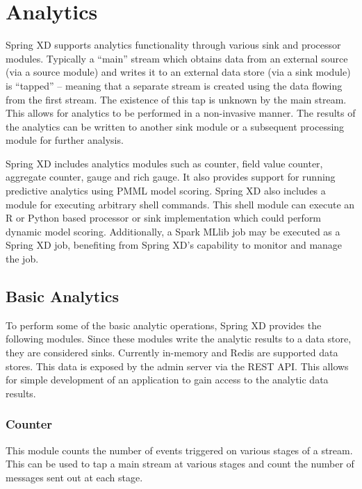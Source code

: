 \section{Analytics}
\label{sec:Analytics}

Spring XD supports analytics functionality through various sink and processor modules.
Typically a ``main'' stream which obtains data from an external source (via
a source module) and writes it to an external data store (via a sink module)
is ``tapped'' -- meaning that a separate stream is created using the data
flowing from the first stream. The existence of this tap is unknown by the
main stream. This allows for analytics to be performed in a non-invasive manner.
The results of the analytics can be written to another sink module or a
subsequent processing module for further analysis.

\par

Spring XD includes analytics modules such as counter, field value counter,
aggregate counter, gauge and rich gauge. It also provides support for running
predictive analytics using PMML\cite{pmml} model scoring. Spring XD also includes a module
for executing arbitrary shell commands. This shell module can execute an R\cite{r-language}
or Python\cite{python-language} based processor or sink implementation which could perform
dynamic model scoring. Additionally, a Spark MLlib job may be executed as a Spring XD job,
benefiting from Spring XD's capability to monitor and manage the job.

\subsection {Basic Analytics}

To perform some of the basic analytic operations, Spring XD provides the following
modules. Since these modules write the analytic results to a data store, they are
considered sinks. Currently in-memory and Redis\cite{redis} are supported data stores. This
data is exposed by the admin server via the REST API. This allows for simple
development of an application to gain access to the analytic data results.

\subsubsection {Counter}

This module counts the number of events triggered on various stages of a stream.
This can be used to tap a main stream at various stages and count the number
of messages sent out at each stage.

